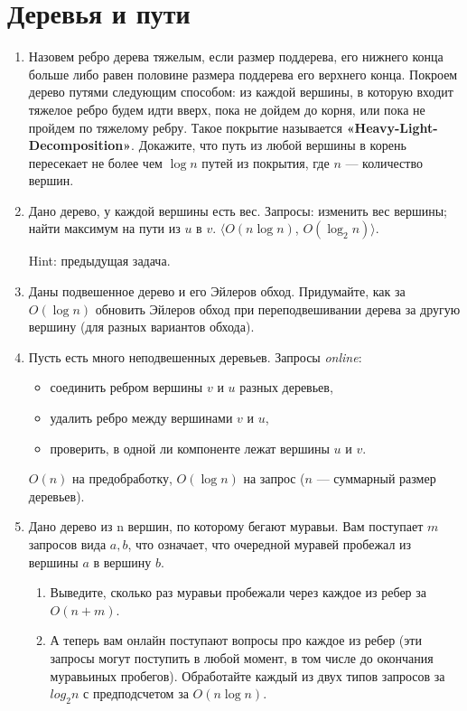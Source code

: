\section*{Деревья и пути}
\begin{enumerate}
	\item Назовем ребро дерева тяжелым, если размер поддерева, его нижнего конца больше либо равен 
	половине размера поддерева его верхнего конца. Покроем дерево путями следующим способом: из 
	каждой вершины, в которую входит тяжелое ребро будем идти вверх, пока не дойдем до корня, или 
	пока не пройдем по тяжелому ребру. Такое покрытие называется 
	\textbf{«Heavy-Light-Decomposition»}. Докажите, что путь из любой вершины в корень пересекает 
	не более чем $\log n$ путей из покрытия, где $n$ — количество вершин.
	
	\item Дано дерево, у каждой вершины есть вес. Запросы: 
	изменить вес вершины; 
	найти максимум на пути из $u$ в $v$. $\langle O(n \log n)$, $O(\log_2 n) \rangle$. 
	
	Hint: предыдущая задача.
	
	\item Даны подвешенное дерево и его Эйлеров обход. Придумайте, как за $O(\log n)$ обновить 
	Эйлеров	обход при переподвешивании дерева за другую вершину (для разных вариантов обхода).
	
	\item Пусть есть много неподвешенных деревьев. Запросы \textit{online}:
	\begin{itemize}
		\item соединить ребром вершины $v$ и $u$ разных деревьев,
		\item удалить ребро между вершинами $v$ и $u$,
		\item проверить, в одной ли компоненте лежат вершины $u$ и $v$.
	\end{itemize}

	$O(n)$ на предобработку, $O(\log n)$ на запрос ($n$ — суммарный размер деревьев).
	
	\item Дано дерево из n вершин, по которому бегают муравьи. Вам поступает $m$
	запросов вида $a, b$, что означает, что очередной муравей пробежал из вершины $a$ в вершину 
	$b$.
	
	\begin{enumerate}
		\item Выведите, сколько раз муравьи пробежали через каждое из ребер за $O(n + m)$.
		\item А теперь вам онлайн поступают вопросы про каждое из ребер (эти запросы могут поступить в любой момент, в том числе до окончания муравьиных пробегов). Обработайте каждый из двух типов запросов за $log_2 n$ с предподсчетом за $O(n \log n)$.
	\end{enumerate}
\end{enumerate}


